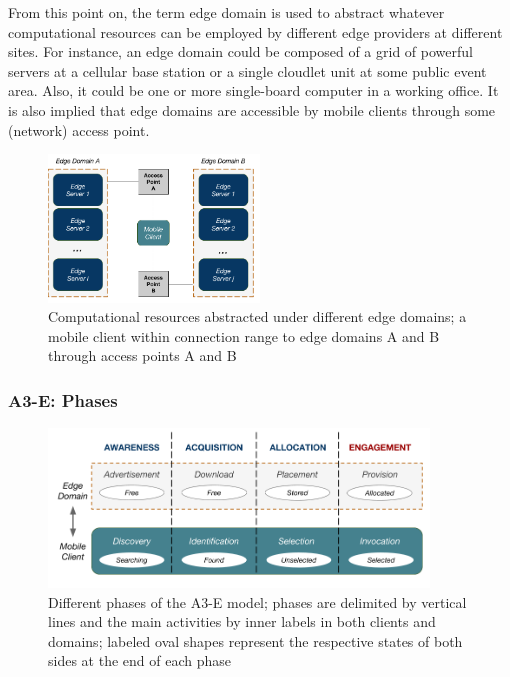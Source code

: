 From this point on, the term edge domain is used to abstract whatever computational resources can be employed by different edge providers at different sites. For instance, an edge domain could be composed of a grid of powerful servers at a cellular base station or a single cloudlet unit at some public event area. Also, it could be one or more single-board computer in a working office. It is also implied that edge domains are accessible by mobile clients through some (network) access point.

\begin{figure}
  \includegraphics[width=0.5\textwidth]{figs/edge-domain-client.png}
  \caption{Computational resources abstracted under different edge domains; a mobile client within connection range to edge domains A and B through access points A and B}
  \label{fig:edge-domain-client}
\end{figure}

\subsubsection{A3-E: Phases}

\begin{figure}
  \includegraphics[width=0.9\textwidth]{figs/A3-E.png}
  \caption{Different phases of the A3-E model; phases are delimited by vertical lines and the main activities by inner labels in both clients and domains; labeled oval shapes represent the respective states of both sides at the end of each phase}
  \label{fig:A3-E}
\end{figure}

